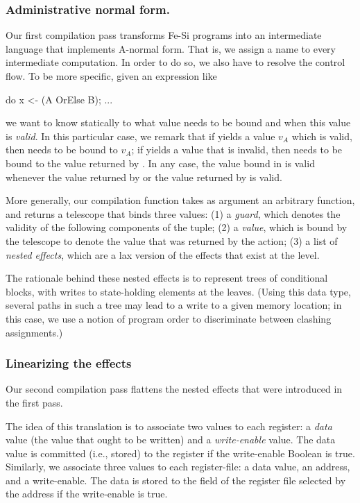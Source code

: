\documentclass{llncs}
\begin{document}
\subsubsection{Administrative normal form.} Our first compilation pass
transforms Fe-Si programs into an intermediate language that
implements A-normal form. That is, we assign a name to every
intermediate computation.
%
In order to do so, we also have to resolve the control flow. To be
more specific, given an expression like
\begin{mcoq}
do x <- (A OrElse B); ... 
\end{mcoq}
we want to know statically to what value  needs to be bound
and when this value is \emph{valid}. 
%
In this particular case, we remark that if  yields a value
$v_A$ which is valid, then  needs to be bound to $v_A$; if
 yields a value that is invalid, then  needs to be
bound to the value returned by . In any case, the value bound
in  is valid whenever the value returned by  or the
value returned by  is valid.

More generally, our compilation function takes as argument an
arbitrary function, and returns a telescope that binds three values:
(1) a \emph{guard}, which denotes the validity of the following
components of the tuple; %
(2) a \emph{value}, which is bound by the telescope to denote the value
that was returned by the action; %
(3) a list of \emph{nested effects}, which are a lax version of the
effects that exist at the  level.

The rationale behind these nested effects is to represent trees of
conditional blocks, with writes to state-holding elements at the
leaves. (Using this data type, several paths in such a tree may lead
to a write to a given memory location; in this case, we use a notion
of program order to discriminate between clashing assignments.)

\subsubsection{Linearizing the effects} Our second compilation pass
flattens the nested effects that were introduced in the first pass.

The idea of this translation is to associate two values to each
register: a \emph{data} value (the value that ought to be written) and
a \emph{write-enable} value. The data value is committed (i.e., stored)
to the register if the write-enable Boolean is true.
%
Similarly, we associate three values to each register-file: a data value, an
address, and a write-enable. The data is stored to the field of the
register file selected by the address if the write-enable is true.  
\end{document}
